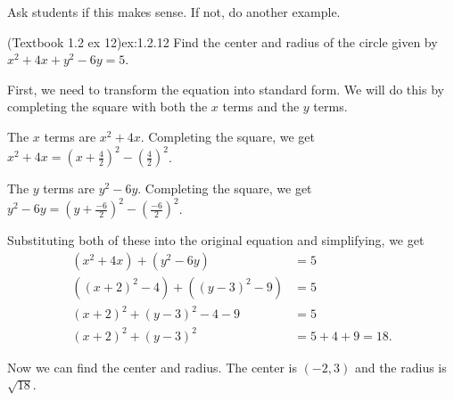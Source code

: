 \documentclass{article}
\begin{document}
\begin{directions}
    Ask students if this makes sense. If not, do another example.
\end{directions}

\begin{example}{(Textbook 1.2 ex 12)}{ex:1.2.12}
    Find the center and radius of the circle given by \(x^2+4x+y^2-6y=5\).
\end{example}
\begin{solution}
    First, we need to transform the equation into standard form. We will do this by completing the square with both the \(x\) terms and the \(y\) terms.

    The \(x\) terms are \(x^2+4x\). Completing the square, we get \(x^2+4x=(x+\frac{4}{2})^2-\left(\frac{4}{2}\right)^2\).

    The \(y\) terms are \(y^2-6y\). Completing the square, we get \(y^2-6y=(y+\frac{-6}{2})^2-\left(\frac{-6}{2}\right)^2\).

    Substituting both of these into the original equation and simplifying, we get
    \begin{align*}
        (x^2+4x)+(y^2-6y)&=5\\
        ((x+2)^2-4)+((y-3)^2-9)&=5\\
        (x+2)^2+(y-3)^2-4-9&=5\\
        (x+2)^2+(y-3)^2&=5+4+9=18.
    \end{align*}

    Now we can find the center and radius. The center is \((-2,3)\) and the radius is \(\sqrt{18}\).
\end{solution}
\end{document}
